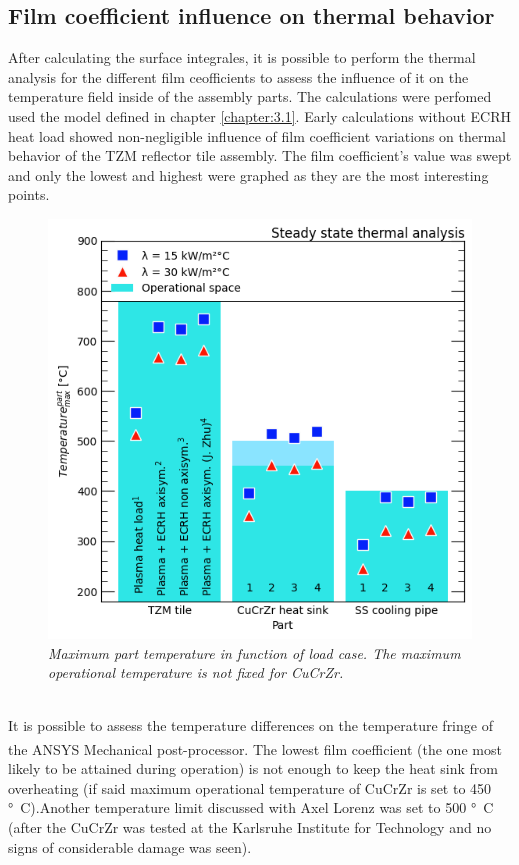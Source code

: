 \subsection{Film coefficient influence on thermal behavior}
\normalsize{After calculating the surface integrales, it is possible to perform the thermal analysis for the different film ceofficients to assess the influence of it on the temperature field inside of the assembly parts. The calculations were perfomed used the model defined in chapter \ref{chapter:3.1}. Early calculations without \acrshort{ECRH} heat load showed non-negligible influence of film coefficient variations on thermal behavior of the \acrshort{TZM} reflector tile assembly. The film coefficient's value was swept and only the lowest and highest were graphed as they are the most interesting points.}
\\
\begin{figure}[h!]
    \label{fig_5_7} 
    \centering
    \includegraphics[width=.7\textwidth]{figures/filmcoefficient15and30.png}
    \caption{\it Maximum part temperature in function of load case. The maximum operational temperature is not fixed for \acrshort{CuCrZr}.}
\end{figure}
\\
\normalsize{\indent It is possible to assess the temperature differences on the temperature fringe of the ANSYS\textsuperscript{\textregistered} Mechanical post-processor. The lowest film coefficient (the one most likely to be attained during operation) is not enough to keep the heat sink from overheating (if said maximum operational temperature of \acrshort{CuCrZr} is set to 450 \unit{\si{\degree}C}).Another temperature limit discussed with Axel Lorenz was set to 500 \unit{\si{\degree}C} (after the \acrshort{CuCrZr} was tested at the Karlsruhe Institute for Technology and no signs of considerable damage was seen).}
